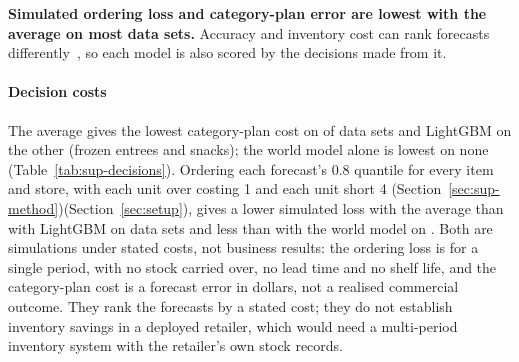 \ifjournal\textbf{Simulated ordering loss and category-plan error are lowest with the average
on most data sets.} Accuracy and inventory cost can rank forecasts differently~\cite{kourentzes2020}, so each
model is also scored by the decisions made from it. \else\paragraph{Decision costs}\fi
The average gives the lowest category-plan cost on \supCatPlanAvgLowest{} of
\supCatPlanSets{} data sets and LightGBM on the other \supCatPlanLgbLowest{}
(frozen entrees and snacks); the world model alone is lowest on none
(Table~\ref{tab:sup-decisions}). Ordering each forecast's 0.8 quantile for every
item and store, with each unit over costing 1 and each unit short 4
\ifjournal (Section~\ref{sec:sup-method})\else (Section~\ref{sec:setup})\fi, gives a lower simulated loss with the average than with LightGBM on
\supOrderAvgBelowLgb{} data sets and less than with the world model on
\supOrderAvgBelowWm{}. Both are simulations under stated costs, not business
results: the ordering loss is for a single period, with no stock carried over, no
lead time and no shelf life, and the category-plan cost is a forecast error in
dollars, not a realised commercial outcome. They rank the forecasts by a stated
cost; they do not establish inventory savings in a deployed retailer, which would
need a multi-period inventory system with the retailer's own stock records.


